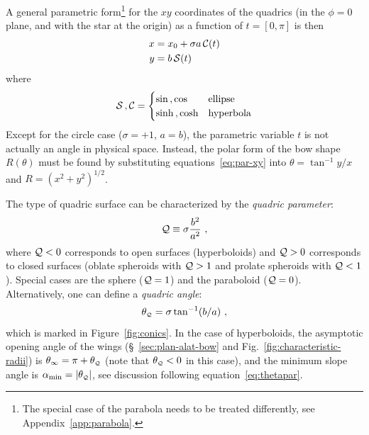 A general parametric form\footnote{%
  The special case of the parabola needs to be treated differently,
  see Appendix~\ref{app:parabola}.} %
for the \(xy\) coordinates of the quadrics (in the \(\phi = 0\) plane,
and with the star at the origin) as a function of \(t = [0, \pi]\) is
then
\begin{gather}
  \label{eq:par-xy}
  \begin{aligned}
    x &= x_0 + \sigma a \operatorname{\mathcal{C}}(t) \\ 
    y &= b\operatorname{\mathcal{S}}(t) 
  \end{aligned}
\end{gather}
where
\begin{equation}
  \label{eq:sin-sinh-etc}
  \operatorname{\mathcal{S}}{}, \operatorname{\mathcal{C}} = \begin{cases}
    \sin{}, \cos & \text{ellipse}\\
    \sinh{}, \cosh & \text{hyperbola}
  \end{cases}
\end{equation}
Except for the circle case (\(\sigma = +1\), \(a = b\)), the parametric
variable \(t\) is not actually an angle in physical space.  Instead,
the polar form of the bow shape \(R(\theta)\) must be found by substituting
equations~\eqref{eq:par-xy} into \(\theta = \tan^{-1} y/x\) and
\(R = (x^2 + y^2)^{1/2}\).

The type of quadric surface can be characterized by the
\textit{quadric parameter}:
\begin{equation}
  \label{eq:Tq}
  \mathcal{Q} \equiv \sigma \frac{b^2} {a^2} \ , 
\end{equation}
where \(\mathcal{Q} < 0\) corresponds to open surfaces (hyperboloids) and
\(\mathcal{Q} > 0\) corresponds to closed surfaces (oblate spheroids with
\(\mathcal{Q} > 1\) and prolate spheroids with \(\mathcal{Q} < 1\)).  Special cases are
the sphere (\(\mathcal{Q} = 1\)) and the paraboloid (\(\mathcal{Q} = 0\)).
Alternatively, one can define a \textit{quadric angle}:
\begin{equation}
  \label{eq:thetaQ}
  \theta_{\scriptscriptstyle \mathcal{Q}} = \sigma \tan^{-1} (b/a) \ ,
\end{equation}
which is marked in Figure~\ref{fig:conics}.  In the case of
hyperboloids, the asymptotic opening angle of the wings
(\S~\ref{sec:plan-alat-bow} and Fig.~\ref{fig:characteristic-radii})
is \(\theta_\infty = \pi + \theta_{\scriptscriptstyle \mathcal{Q}}\) (note that \(\theta_{\scriptscriptstyle \mathcal{Q}} < 0\) in this case), and
the minimum slope angle is \(\alpha_{\mathrm{min}} = \lvert\theta_{\scriptscriptstyle \mathcal{Q}}\rvert\), see
discussion following equation~\eqref{eq:thetapar}.

